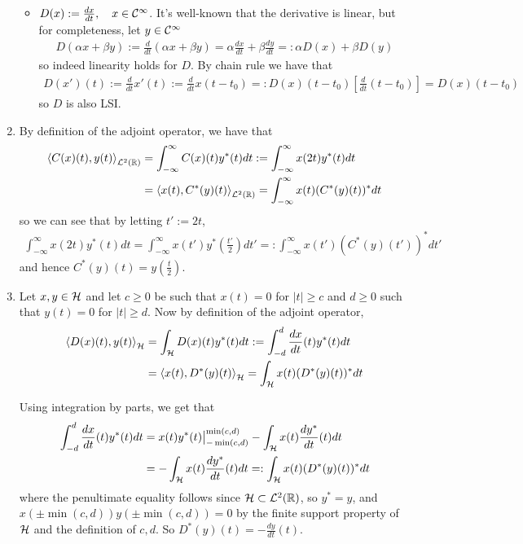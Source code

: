 \documentclass{article}
\makeatletter
\newcommand{\skipitems}[1]{%
  \addtocounter{\@enumctr}{#1}%
}
\makeatother
\begin{document}
\begin{enumerate}[label=(\roman*)]
\begin{itemize}
            \item $D(x):=\frac{dx}{dt},\quad x\in \mathcal{C}^\infty$. It's well-known that the derivative is linear, but for completeness, let $y\in \mathcal{C}^\infty$
            \begin{align}
                D(\alpha x + \beta y) := \frac{d}{dt}(\alpha x + \beta y) = \alpha \frac{dx}{dt} + \beta \frac{dy}{dt} =: \alpha D(x) + \beta D(y)
            \end{align}
            so indeed linearity holds for $D$. By chain rule we have that
            \begin{align}
                D(x')(t):=\frac{d}{dt}x'(t) := \frac{d}{dt}x(t-t_0) =:  D(x)(t-t_0) \left[\frac{d}{dt}(t-t_0)\right] =  D(x)(t-t_0)
            \end{align}
            so $D$ is also LSI.
        \end{itemize}
        
        \skipitems{1}
        \item By definition of the adjoint operator, we have that
        \begin{align}
            \left\langle C(x)(t),y(t) \right\rangle_{\mathcal{L}^2(\mathbb{R})} &= \int_{-\infty}^{\infty} C(x)(t)y^*(t) dt := \int_{-\infty}^{\infty} x(2t) y^*(t) dt \\
            &= \left\langle x(t),C^*(y)(t) \right\rangle_{\mathcal{L}^2(\mathbb{R})} = \int_{-\infty}^{\infty} x(t) (C^*(y)(t))^* dt
        \end{align}
        so we can see that by letting $t':=2t$,
        \begin{align}
            \int_{-\infty}^{\infty} x(2t) y^*(t) dt = \int_{-\infty}^{\infty} x(t') y^*\left(\frac{t'}{2}\right) dt'=: \int_{-\infty}^{\infty} x(t') (C^*(y)(t'))^* dt'
        \end{align}
        and hence $C^*(y)(t)=y\left(\frac{t}{2}\right)$.
        \item Let $x,y\in \mathcal{H}$ and let $c\geq 0$ be such that $x(t)=0$ for $|t|\geq c$ and $d\geq 0$ such that $y(t)=0$ for $|t|\geq d$. Now by definition of the adjoint operator,
        \begin{align}
            \left\langle D(x)(t),y(t) \right\rangle_{\mathcal{H}} &= \int_{\mathcal{H}} D(x)(t)y^*(t) dt := \int_{-d }^{d} \frac{dx}{dt}(t) y^*(t) dt \\
            &= \left\langle x(t),D^*(y)(t) \right\rangle_{\mathcal{H}} = \int_{\mathcal{H}} x(t) (D^*(y)(t))^* dt
        \end{align}
        
        Using integration by parts, we get that
        \begin{align}
            \int_{-d }^{d} \frac{dx}{dt}(t) y^*(t) dt &=  x(t) y^*(t) \big\rvert_{-\min(c,d)}^{\min(c,d)} -  \int_{\mathcal{H}} x(t) \frac{dy^*}{dt}(t) dt \\
            &= -  \int_{\mathcal{H}} x(t) \frac{dy^*}{dt}(t) dt =: \int_{\mathcal{H}} x(t) (D^*(y)(t))^* dt
        \end{align}
        where the penultimate equality follows since $\mathcal{H}\subset \mathcal{L}^2(\mathbb{R})$, so $y^* = y$, and $x(\pm \min(c,d))y(\pm \min(c,d))=0$ by the finite support property of $\mathcal{H}$ and the definition of $c,d$. So $D^*(y)(t)=-\frac{dy}{dt}(t)$.
        
    \end{enumerate}
\end{document}
